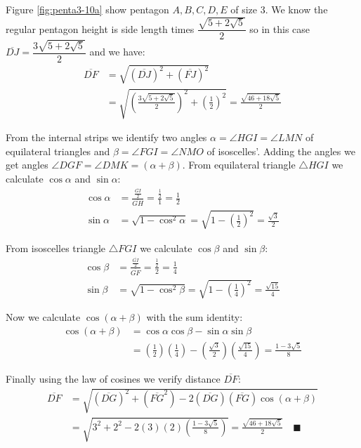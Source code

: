 \documentclass[11pt]{article}
\begin{document}
Figure \ref{fig:penta3-10a} show pentagon $A,B,C,D,E$ of size 3. We know the regular pentagon height is side length times $\dfrac{\sqrt{5+2\sqrt5}}2$ so in this case $\overline{DJ} = \dfrac{3\sqrt{5+2\sqrt5}}2$ and we have:
\begin{align}
\overline{DF} &= \sqrt{(\overline{DJ})^2 + (\overline{FJ})^2}\nonumber\\
 &= \sqrt{\left(\frac{3\sqrt{5+2\sqrt5}}2\right)^2 + \left(\frac{1}2\right)^2}
 = \frac{\sqrt{46+18\sqrt5}}2
\end{align}

From the internal strips we identify two angles $\alpha = \angle{HGI} = \angle{LMN}$ of equilateral triangles and $\beta = \angle{FGI} = \angle{NMO}$ of isoscelles'. Adding the angles we get angles $\angle{DGF} = \angle{DMK} = (\alpha + \beta)$. From equilateral triangle $\triangle{HGI}$ we calculate $\cos\alpha$ and $\sin\alpha$:
\begin{align}
\cos\alpha &= \frac{\frac{\overline{GI}}2}{\overline{GH}} = \frac{\frac{1}2}1 = \frac{1}2\\
\sin\alpha &= \sqrt{1 - \cos^2\alpha} = \sqrt{1 - \left(\frac{1}2\right)^2} = \frac{\sqrt3}2
\end{align}

From isoscelles triangle $\triangle{FGI}$ we calculate $\cos\beta$ and $\sin\beta$:
\begin{align}
\cos\beta &= \frac{\frac{\overline{GI}}2}{\overline{GF}} = \frac{\frac{1}2}{2} = \frac{1}4\\
\sin\beta &= \sqrt{1 - \cos^2\beta} = \sqrt{1 - \left(\frac{1}4\right)^2} = \frac{\sqrt{15}}4
\end{align}

Now we calculate $\cos(\alpha+\beta)$ with the sum identity:
\begin{align}
\cos(\alpha+\beta) &= \cos\alpha\cos\beta - \sin\alpha\sin\beta \nonumber\\
 &= \left(\frac{1}2\right)\left(\frac{1}4\right)
  -\left(\frac{\sqrt3}2\right)\left(\frac{\sqrt{15}}4\right)
 = \frac{1 - 3\sqrt5}8
\end{align}

Finally using the law of cosines we verify distance $\overline{DF}$:
\begin{align}
\overline{DF} &= \sqrt{(\overline{DG})^2 + (\overline{FG}^2)
 - 2(\overline{DG})(\overline{FG})\cos(\alpha+\beta)} \nonumber\\
 &= \sqrt{3^2 + 2^2 - 2(3)(2)\left(\frac{1 - 3\sqrt5}8\right)}
 = \frac{\sqrt{46+18\sqrt5}}2 \quad\blacksquare
\end{align}
\end{document}
